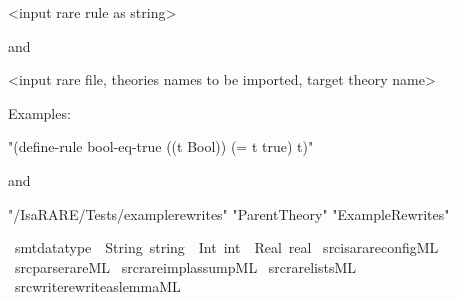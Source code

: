 \begin{isabellebody}
\begin{isamarkuptext}
  <input rare rule as string> 

and


  <input rare file, theories names to be imported, target theory name> 

Examples:


  "(define-rule bool-eq-true ((t Bool)) (= t true) t)"

and 


  "/IsaRARE/Tests/example{\textunderscore}rewrites" "Parent{\textunderscore}Theory" "Example{\textunderscore}Rewrites"%
\end{isamarkuptext}\isamarkuptrue%
\isamarkupfalse%
\ smt{\isacharunderscore}{\kern0pt}datatype\ {\isacharequal}{\kern0pt}\ String\ string\ {\isacharbar}{\kern0pt}\ Int\ int\ {\isacharbar}{\kern0pt}\ Real\ real%
\isadelimdocument
%
\endisadelimdocument
%
\isatagdocument
%
\isamarkuptrue%
%
\isamarkuptrue%
%
\endisatagdocument
{\isafolddocument}%
%
\isadelimdocument
%
\endisadelimdocument
%
\isadelimML
%
\endisadelimML
%
\isatagML
{}\isamarkupfalse%
\ {\isacartoucheopen}src{\isacharslash}{\kern0pt}isarare{\isacharunderscore}{\kern0pt}config{\isachardot}{\kern0pt}ML{\isacartoucheclose}\isanewline
{}\isamarkupfalse%
\ {\isacartoucheopen}src{\isacharslash}{\kern0pt}parse{\isacharunderscore}{\kern0pt}rare{\isachardot}{\kern0pt}ML{\isacartoucheclose}\isanewline
{}\isamarkupfalse%
\ {\isacartoucheopen}src{\isacharslash}{\kern0pt}rare{\isacharunderscore}{\kern0pt}impl{\isacharunderscore}{\kern0pt}assump{\isachardot}{\kern0pt}ML{\isacartoucheclose}\isanewline
{}\isamarkupfalse%
\ {\isacartoucheopen}src{\isacharslash}{\kern0pt}rare{\isacharunderscore}{\kern0pt}lists{\isachardot}{\kern0pt}ML{\isacartoucheclose}\isanewline
{}\isamarkupfalse%
\ {\isacartoucheopen}src{\isacharslash}{\kern0pt}write{\isacharunderscore}{\kern0pt}rewrite{\isacharunderscore}{\kern0pt}as{\isacharunderscore}{\kern0pt}lemma{\isachardot}{\kern0pt}ML{\isacartoucheclose}\isanewline
\isanewline
\isanewline
\isanewline
\isanewline

\end{isabellebody}
